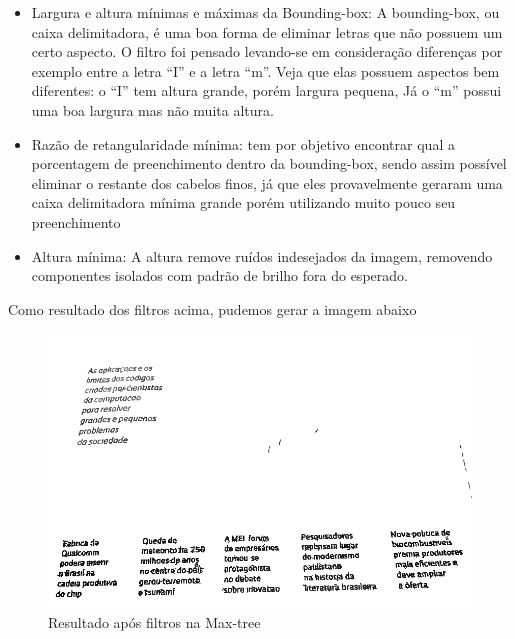 \documentclass{article}
\begin{document}
	\begin{itemize}
		\item Largura e altura mínimas e máximas da Bounding-box: A bounding-box, ou caixa delimitadora, é uma boa forma de eliminar letras que não possuem um certo aspecto. O filtro foi pensado levando-se em consideração diferenças por exemplo entre a letra ``I'' e a letra ``m''. Veja que elas possuem aspectos bem diferentes: o ``I'' tem altura grande, porém largura pequena, Já o ``m'' possui uma boa largura mas não muita altura.
		\item Razão de retangularidade mínima: tem por objetivo encontrar qual a porcentagem de preenchimento dentro da bounding-box, sendo assim possível eliminar o restante dos cabelos finos, já que eles provavelmente geraram uma caixa delimitadora mínima grande porém utilizando muito pouco seu preenchimento
		\item Altura mínima: A altura remove ruídos indesejados da imagem, removendo componentes isolados com padrão de brilho fora do esperado.
	\end{itemize}
	
	Como resultado dos filtros acima, pudemos gerar a imagem abaixo
	
	\begin{figure}[H]
		\centering
		\includegraphics[scale=0.5]{images/4_resultado.png}
		\caption{Resultado após filtros na Max-tree}
	\end{figure}
	
\end{document}
